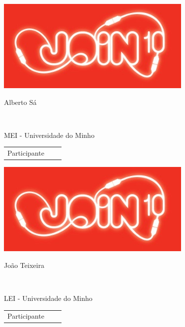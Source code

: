 \documentclass[twocolumn]{article}
\begin{document}
  
 \vspace{13mm} 
 \begin{minipage}{89mm} 
 \includegraphics{design/logo}\\ 
 
 \addvspace{5mm} 
 
 \begin{center} 
 \huge{Alberto Sá} 
 \scriptsize{ 
 \begin{tabular*}{0.75\textwidth}{c} 
 \hline 
 \end{tabular*}}\\ 
MEI - Universidade do Minho
 \end{center} 
 
 \begin{flushright} 
 \begin{tabular}{r l l} 
 \normalsize{Participante} & & 
 \end{tabular} 
 \end{flushright} 
 \end{minipage} 
 
  \newpage 
 
 \begin{minipage}{89mm} 
 \includegraphics{design/logo}\\ 
 
 \addvspace{5mm} 
 
 \begin{center} 
 \huge{João Teixeira} 
 \scriptsize{ 
 \begin{tabular*}{0.75\textwidth}{c} 
 \hline 
 \end{tabular*}}\\ 
LEI - Universidade do Minho
 \end{center} 
 
 \begin{flushright} 
 \begin{tabular}{r l l} 
 \normalsize{Participante} & & 
 \end{tabular} 
 \end{flushright} 
 \end{minipage} 
 
\end{document}
